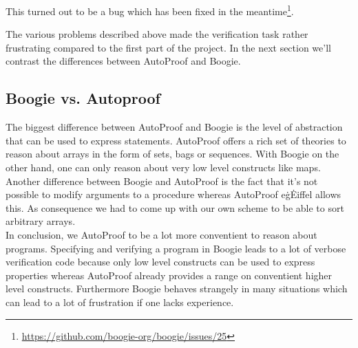 This turned out to be a bug which has been fixed in 
the meantime\footnote{\url{https://github.com/boogie-org/boogie/issues/25}}.

The various problems described above made the verification task rather frustrating compared to the
first part of the project. In the next section we'll contrast the differences between AutoProof and Boogie.

\subsection{Boogie vs. Autoproof}
The biggest difference between AutoProof and Boogie is the level of abstraction that can be 
used to express statements. AutoProof offers a rich set of theories to reason about arrays in the
form of sets, bags or sequences. With Boogie on the other hand, one can only reason about very 
low level constructs like maps.\\

Another difference between Boogie and AutoProof is the fact that it's not possible to modify
arguments to a procedure whereas AutoProof e\.g\. Eiffel allows this. As consequence we had to come up
with our own scheme to be able to sort arbitrary arrays.\\

In conclusion, we AutoProof to be a lot more conventient to reason about programs. Specifying and
verifying a program in Boogie leads to a lot of verbose verification code because only low level constructs 
can be used to express properties whereas AutoProof already provides a range on conventient higher level constructs. 
Furthermore Boogie behaves strangely in many situations which can lead to a lot of frustration if one lacks experience.

